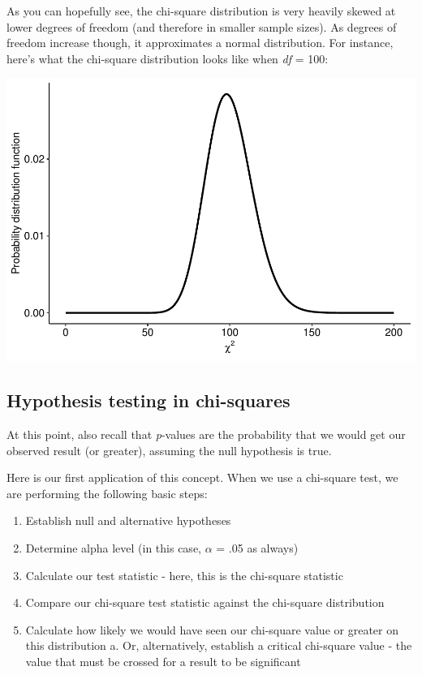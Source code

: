 \documentclass[
]{book}
\providecommand{\tightlist}{%
  \setlength{\itemsep}{0pt}\setlength{\parskip}{0pt}}
\begin{document}
As you can hopefully see, the chi-square distribution is very heavily skewed at lower degrees of freedom (and therefore in smaller sample sizes). As degrees of freedom increase though, it approximates a normal distribution. For instance, here's what the chi-square distribution looks like when \emph{df} = 100:

\includegraphics{_main_files/figure-latex/unnamed-chunk-111-1.pdf}

\subsection{Hypothesis testing in chi-squares}\label{hypothesis-testing-in-chi-squares}

At this point, also recall that \emph{p}-values are the probability that we would get our observed result (or greater), assuming the null hypothesis is true.

Here is our first application of this concept. When we use a chi-square test, we are performing the following basic steps:

\begin{enumerate}
\def\labelenumi{\arabic{enumi}.}
\tightlist
\item
  Establish null and alternative hypotheses
\item
  Determine alpha level (in this case, \(\alpha\) = .05 as always)
\item
  Calculate our test statistic - here, this is the chi-square statistic
\item
  Compare our chi-square test statistic against the chi-square distribution
\item
  Calculate how likely we would have seen our chi-square value or greater on this distribution
  a. Or, alternatively, establish a critical chi-square value - the value that must be crossed for a result to be significant
\end{enumerate}
\end{document}
